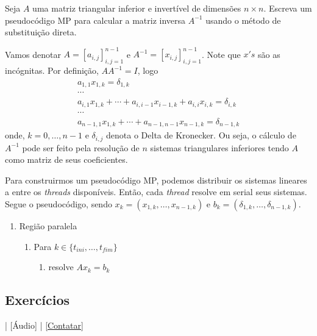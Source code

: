 \begin{exeresol}
  Seja $A$ uma matriz triangular inferior e invertível de dimensões $n\times n$. Escreva um pseudocódigo MP para calcular a matriz inversa $A^{-1}$ usando o método de substituição direta.
\end{exeresol}
\begin{resol}
  Vamos denotar $A=[a_{i,j}]_{i,j=1}^{n-1}$ e $A^{-1} = [x_{i,j}]_{i,j=1}^{n-1}$. Note que $x's$ são as incógnitas. Por definição, $AA^{-1}=I$, logo
  \begin{gather}
    a_{1,1}x_{1,k} = \delta_{1,k}\\
    \cdots\\
    a_{i,1}x_{1,k}+\cdots+a_{i,i-1}x_{i-1,k}+a_{i,i}x_{i,k}=\delta_{i,k}\\
    \cdots\\
    a_{n-1,1}x_{1,k}+\cdots+a_{n-1,n-1}x_{n-1,k}=\delta_{n-1,k}
  \end{gather}
  onde, $k=0,\dotsc,n-1$ e $\delta_{i,j}$ denota o Delta de Kronecker. Ou seja, o cálculo de $A^{-1}$ pode ser feito pela resolução de $n$ sistemas triangulares inferiores tendo $A$ como matriz de seus coeficientes.

  Para construirmos um pseudocódigo MP, podemos distribuir os sistemas lineares a entre os {\it threads} disponíveis. Então, cada {\it thread} resolve em serial seus sistemas. Segue o pseudocódigo, sendo $x_k=(x_{1,k},\dotsc,x_{n-1,k})$ e $b_k = (\delta_{1,k},\dotsc,\delta_{n-1,k})$.
  \begin{enumerate}
  \item Região paralela
    \begin{enumerate}
    \item Para $k\in\{t_{ini},\dotsc,t_{fim}\}$
      \begin{enumerate}
      \item resolve $Ax_k=b_k$
      \end{enumerate}
    \end{enumerate}
  \end{enumerate}
\end{resol}

\subsection*{Exercícios}

\begin{flushright}
  [Vídeo] | [Áudio] | \href{https://phkonzen.github.io/notas/contato.html}{[Contatar]}
\end{flushright}

